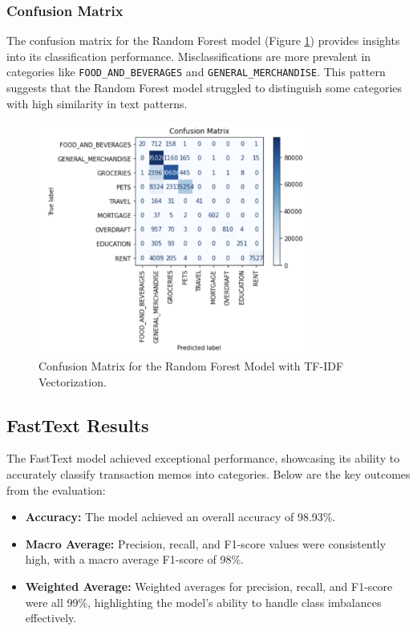 \documentclass[12pt,letterpaper]{article}
\begin{document}
\subsubsection{Confusion Matrix}
The confusion matrix for the Random Forest model (Figure \ref{fig:confusion_matrix_rf}) provides insights into its classification performance. Misclassifications are more prevalent in categories like \texttt{FOOD\_AND\_BEVERAGES} and \texttt{GENERAL\_MERCHANDISE}. This pattern suggests that the Random Forest model struggled to distinguish some categories with high similarity in text patterns.

\begin{figure}[H]
    \centering
    \includegraphics[width=0.8\textwidth]{figure/random_forest_confusion.png}
    \caption{Confusion Matrix for the Random Forest Model with TF-IDF Vectorization.}
    \label{fig:confusion_matrix_rf}
\end{figure}

\subsection{FastText Results}
The FastText model achieved exceptional performance, showcasing its ability to accurately classify transaction memos into categories. Below are the key outcomes from the evaluation:

\begin{itemize}
    \item \textbf{Accuracy:} The model achieved an overall accuracy of 98.93\%.
    \item \textbf{Macro Average:} Precision, recall, and F1-score values were consistently high, with a macro average F1-score of 98\%.
    \item \textbf{Weighted Average:} Weighted averages for precision, recall, and F1-score were all 99\%, highlighting the model's ability to handle class imbalances effectively.
\end{itemize}
\end{document}
